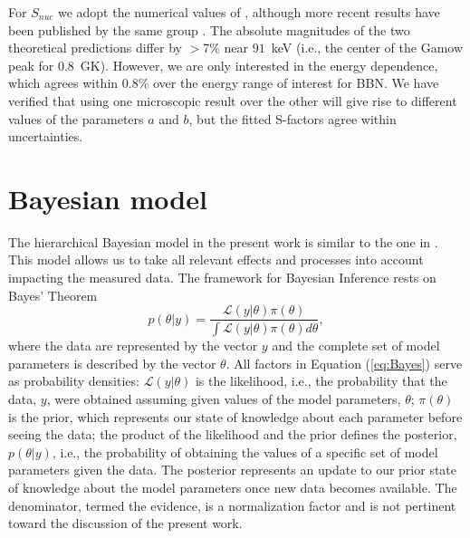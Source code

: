 \documentclass[twocolumn]{aastex63}
\begin{document}
For $S_{nuc}$ we adopt the numerical values of \citet{marcucci05}, although more recent results have been published by the same group \citep{Mar16}. The absolute magnitudes of the two theoretical predictions differ by $>$7\% near $91$~keV (i.e., the center of the Gamow peak for $0.8$~GK). However, we are only interested in the energy dependence, which agrees within $0.8$\% over the energy range of interest for BBN. We have verified that using one microscopic result over the other will give rise to different values of the parameters $a$ and $b$, but the fitted S-factors agree within uncertainties. 

\section{Bayesian model} 
\label{sec:Bayemodel}
The hierarchical Bayesian model in the present work is similar to the one in \citet{iliadis16,de_Souza_2020}. This model allows us to take all relevant effects and processes into account impacting the measured data. The framework for Bayesian Inference rests on Bayes' Theorem \citep{2017bmad}
%
\begin{equation}
\label{eq:Bayes}
    p(\theta|y) = \frac{\mathcal{L}(y|\theta)\pi(\theta)}{\int \mathcal{L}(y|\theta)\pi(\theta)d\theta},
\end{equation}
%
where the data are represented by the vector $y$ and the complete set of model parameters is described by the vector $\theta$. All factors in Equation (\ref{eq:Bayes}) serve as probability densities: $\mathcal{L}(y|\theta)$ is the likelihood, i.e., the probability that the data, $y$, were obtained assuming given values of the model parameters, $\theta$; $\pi(\theta)$ is the prior, which represents our state of knowledge about each parameter before seeing the data; the product of the likelihood and the prior defines the posterior, $p(\theta|y)$, i.e., the probability of obtaining the values of a specific set of model parameters given the data. The posterior represents an update to our prior state of knowledge about the model parameters once new data becomes available. The denominator, termed the evidence, is a normalization factor and is not pertinent toward the discussion of the present work. 
\end{document}
